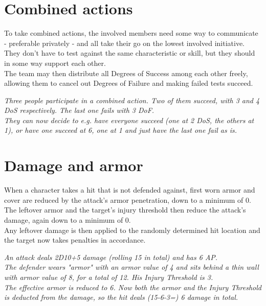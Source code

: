 \section{Combined actions}
\label{combinedaction}
To take combined actions, the involved members need some way to communicate - preferable privately - and all take their go on the lowest involved initiative. They don't have to test against the same characteristic or skill, but they should in some way support each other.\\
The team may then distribute all Degrees of Success among each other freely, allowing them to cancel out Degrees of Failure and making failed tests succeed.
\begin{exampleblock}
	\itshape
	Three people participate in a combined action. Two of them succeed, with 3 and 4 DoS respectively. The last one fails with 3 DoF.\\
	They can now decide to e.g. have everyone succeed (one at 2 DoS, the others at 1), or have one succeed at 6, one at 1 and just have the last one fail as is.
\end{exampleblock}
\section{Damage and armor}
When a character takes a hit that is not defended against, first worn armor and cover are reduced by the attack's armor penetration, down to a minimum of 0. \\
The leftover armor and the target’s injury threshold then reduce the attack’s damage, again down to a minimum of 0. \\
Any leftover damage is then applied to the randomly determined hit location and the target now takes penalties in accordance.
\begin{exampleblock}
	\itshape
	An attack deals 2D10+5 damage (rolling 15 in total) and has 6 AP.\\
	The defender wears "armor" with an armor value of 4 and sits behind a thin wall with armor value of 8, for a total of 12. His Injury Threshold is 3.\\
	The effective armor is reduced to 6. Now both the armor and the Injury Threshold is deducted from the damage, so the hit deals (15-6-3=) 6 damage in total.
\end{exampleblock}
